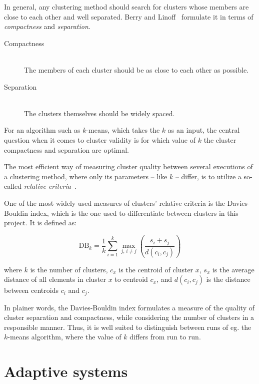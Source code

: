     In general, any clustering method should search for clusters whose members are close to each other and well separated. Berry and Linoff~\cite{Berry1996} formulate it in terms of \emph{compactness} and \emph{separation}.

    \begin{description}
      \item[Compactness] \hfill \\
        The members of each cluster should be as close to each other as possible.
      \item[Separation] \hfill \\
        The clusters themselves should be widely spaced.
    \end{description}

    For an algorithm such as $k$-means, which takes the $k$ as an input, the central question when it comes to cluster validity is for which value of $k$ the cluster compactness and separation are optimal.

    The most efficient way of measuring cluster quality between several executions of a clustering method, where only its parameters -- like $k$ -- differ, is to utilize a so-called \emph{relative criteria}~\cite{Halkidi2001}.

    One of the most widely used measures of clusters' relative criteria is the Davies-Bouldin index, which is the one used to differentiate between clusters in this project. It is defined as:

    \begin{equation}
      \text{DB}_k = \frac{1}{k} \sum_{i=1}^k \max_{j,\,i \neq j} \left( \frac{s_i + s_j}{d(c_i, c_j)} \right)
    \end{equation}

    where $k$ is the number of clusters, $c_x$ is the centroid of cluster $x$, $s_x$ is the average distance of all elements in cluster $x$ to centroid $c_x$, and $d(c_i,c_j)$ is the distance between centroids $c_i$ and $c_j$.

    In plainer words, the Davies-Bouldin index formulates a measure of the quality of cluster separation and compactness, while considering the number of clusters in a responsible manner. Thus, it is well suited to distinguish between runs of eg. the $k$-means algorithm, where the value of $k$ differs from run to run.

\section{Adaptive systems}
\label{survey:adaptive_systems}

